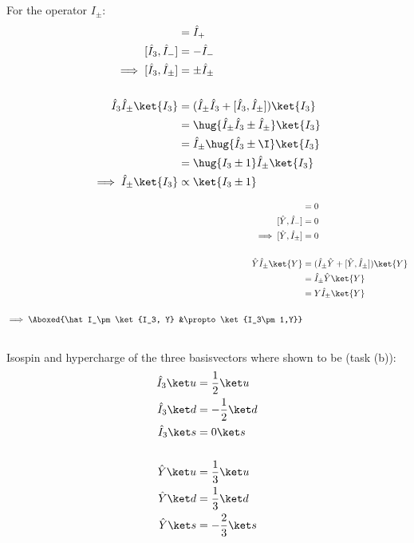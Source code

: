 \documentclass[exb,en]{exercise_5.0}
\begin{document}
For the operator $I_\pm$:
\begin{align*}
    [\hat I_3, \hat I_+] &= \hat I_+ \\
    [\hat I_3, \hat I_-] &= -\hat I_-\\
    \implies [\hat I_3, \hat I_\pm] &= \pm \hat I_\pm\\ 
    \\
    \hat I_3 \hat I_\pm \ket{I_3} 
    &= (\hat I_\pm\hat I_3  + [\hat I_3, \hat I_\pm]) \ket{I_3} \\
    &= \hug{\hat I_\pm\hat I_3  \pm \hat I_\pm} \ket{I_3} \\
    &= \hat I_\pm\hug{\hat I_3  \pm\I } \ket{I_3} \\
    &= \hug{I_3 \pm 1}\hat I_\pm \ket{ I_3} \\
    \implies \hat I_\pm\ket{I_3} &\propto \ket{I_3\pm1}
\end{align*}

\begin{align*}
    [\hat Y, \hat I_+] &= 0\\
    [\hat Y, \hat I_-] &= 0\\
    \implies [\hat Y, \hat I_\pm] &= 0\\ 
    \\
    \hat Y \hat I_\pm \ket{Y} 
    &= (\hat I_\pm\hat Y  + [\hat Y, \hat I_\pm]) \ket{Y} \\
    &= \hat I_\pm\hat Y \ket{Y} \\
    &= Y \hat I_\pm \ket{Y} \\
    \\
    \implies \Aboxed{\hat I_\pm\ket{I_3, Y} &\propto \ket{I_3\pm1,Y}}
\end{align*}

\subsection{}
Isospin and hypercharge of the three basisvectors where shown to be (task (b)): 
\begin{align*}
    \hat I_3 \ket u &= \frac12\ket u\\
    \hat I_3 \ket d &= -\frac12\ket d\\
    \hat I_3 \ket s &= 0 \ket s \\
\\
    \hat Y \ket u &= \frac13\ket u\\
    \hat Y \ket d &= \frac13\ket d\\
    \hat Y \ket s &= -\frac23 \ket s
\end{align*}
\end{document}
